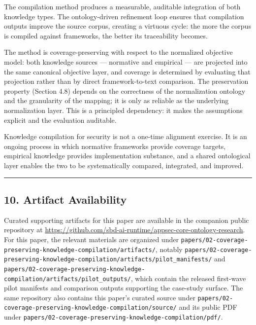 \documentclass[
]{article}
\begin{document}
The compilation method produces a measurable, auditable integration of
both knowledge types. The ontology-driven refinement loop ensures that
compilation outputs improve the source corpus, creating a virtuous
cycle: the more the corpus is compiled against frameworks, the better
its traceability becomes.

The method is coverage-preserving with respect to the normalized
objective model: both knowledge sources --- normative and empirical ---
are projected into the same canonical objective layer, and coverage is
determined by evaluating that projection rather than by direct
framework-to-text comparison. The preservation property (Section 4.8)
depends on the correctness of the normalization ontology and the
granularity of the mapping; it is only as reliable as the underlying
normalization layer. This is a principled dependency: it makes the
assumptions explicit and the evaluation auditable.

Knowledge compilation for security is not a one-time alignment exercise.
It is an ongoing process in which normative frameworks provide coverage
targets, empirical knowledge provides implementation substance, and a
shared ontological layer enables the two to be systematically compared,
integrated, and improved.

\begin{center}\rule{0.5\linewidth}{0.5pt}\end{center}

\subsection{10. Artifact Availability}\label{artifact-availability}

Curated supporting artifacts for this paper are available in the
companion public repository at
\url{https://github.com/sbd-ai-runtime/appsec-core-ontology-research}.
For this paper, the relevant materials are organized under
\texttt{papers/02-coverage-preserving-knowledge-compilation/artifacts/},
notably
\texttt{papers/02-coverage-preserving-knowledge-compilation/artifacts/pilot\_manifests/}
and
\texttt{papers/02-coverage-preserving-knowledge-compilation/artifacts/pilot\_outputs/},
which contain the released first-wave pilot manifests and comparison
outputs supporting the case-study surface. The same repository also
contains this paper's curated source under
\texttt{papers/02-coverage-preserving-knowledge-compilation/source/} and
its public PDF under
\texttt{papers/02-coverage-preserving-knowledge-compilation/pdf/}.
\end{document}
